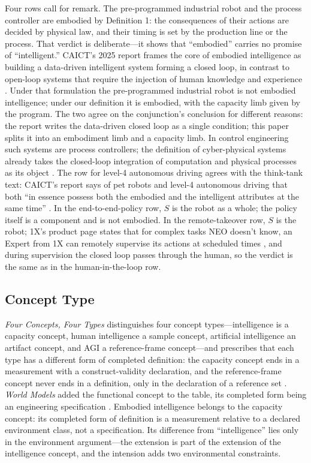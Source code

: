\documentclass[10pt]{article}
\begin{document}
Four rows call for remark. The pre-programmed industrial robot and the process controller are embodied by Definition 1: the consequences of their actions are decided by physical law, and their timing is set by the production line or the process. That verdict is deliberate---it shows that ``embodied'' carries no promise of ``intelligent.'' CAICT's 2025 report frames the core of embodied intelligence as building a data-driven intelligent system forming a closed loop, in contrast to open-loop systems that require the injection of human knowledge and experience \cite{caict2025}. Under that formulation the pre-programmed industrial robot is not embodied intelligence; under our definition it is embodied, with the capacity limb given by the program. The two agree on the conjunction's conclusion for different reasons: the report writes the data-driven closed loop as a single condition; this paper splits it into an embodiment limb and a capacity limb. In control engineering such systems are process controllers; the definition of cyber-physical systems already takes the closed-loop integration of computation and physical processes as its object \cite{lee2008}. The row for level-4 autonomous driving agrees with the think-tank text: CAICT's report says of pet robots and level-4 autonomous driving that both ``in essence possess both the embodied and the intelligent attributes at the same time'' \cite{caict2024}. In the end-to-end-policy row, $S$ is the robot as a whole; the policy itself is a component and is not embodied. In the remote-takeover row, $S$ is the robot; 1X's product page states that for complex tasks NEO doesn't know, an Expert from 1X can remotely supervise its actions at scheduled times \cite{onex2026}, and during supervision the closed loop passes through the human, so the verdict is the same as in the human-in-the-loop row.

\subsection{Concept Type}\label{sec:concepttype}

\textit{Four Concepts, Four Types} distinguishes four concept types---intelligence is a capacity concept, human intelligence a sample concept, artificial intelligence an artifact concept, and AGI a reference-frame concept---and prescribes that each type has a different form of completed definition: the capacity concept ends in a measurement with a construct-validity declaration, and the reference-frame concept never ends in a definition, only in the declaration of a reference set \cite{yu2026four}. \textit{World Models} added the functional concept to the table, its completed form being an engineering specification \cite{yu2026wm}. Embodied intelligence belongs to the capacity concept: its completed form of definition is a measurement relative to a declared environment class, not a specification. Its difference from ``intelligence'' lies only in the environment argument---the extension is part of the extension of the intelligence concept, and the intension adds two environmental constraints.
\end{document}

